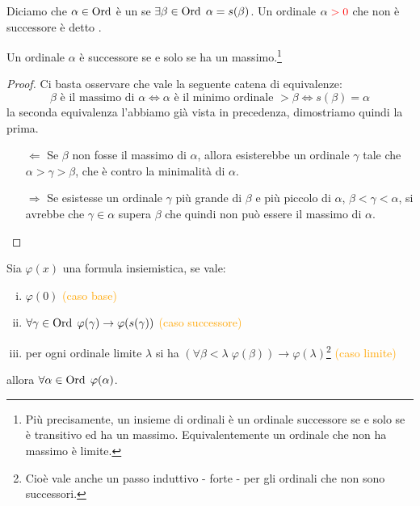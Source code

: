 \begin{definition}
	Diciamo che $\alpha \in \operatorname{Ord}$ è un  se $\exists \beta \in \operatorname{Ord} \; \alpha = s(\beta)$. Un ordinale $\alpha\;\textcolor{red}{> 0}$ che non è successore è detto .
\end{definition}

\begin{remark}
	Un ordinale $\alpha$ è successore se e solo se ha un massimo.\footnote{Più precisamente, un insieme di ordinali è un ordinale successore se e solo se è transitivo ed ha un massimo. Equivalentemente un ordinale che non ha massimo è limite.}
\end{remark}

\begin{proof}
	Ci basta osservare che vale la seguente catena di equivalenze:
	\[ \text{$\beta$ è il massimo di $\alpha$} \iff \text{$\alpha$ è il minimo ordinale $> \beta$} \iff s(\beta) = \alpha
		\]
	la seconda equivalenza l'abbiamo già vista in precedenza, dimostriamo quindi la prima.
	\begin{itemize}
		\item[$\boxed{\Longleftarrow}$] Se $\beta$ non fosse il massimo di $\alpha$, allora esisterebbe un ordinale $\gamma$ tale che $\alpha > \gamma > \beta$, che è contro la minimalità di $\alpha$.
		\item[$\boxed{\Longrightarrow}$] Se esistesse un ordinale $\gamma$ più grande di $\beta$ e più piccolo di $\alpha$, $\beta < \gamma < \alpha$, si avrebbe che $\gamma \in \alpha$ supera $\beta$ che quindi non può essere il massimo di $\alpha$.
	\end{itemize}
\end{proof}

\begin{proposition}
	\label{induz_transf2}
	Sia $\varphi(x)$ una formula insiemistica, se vale:
	\begin{enumerate}[(i)]
		\item $\varphi(0)$ \textcolor{orange}{(caso base)}
		\item $\forall \gamma \in \operatorname{Ord} \; \varphi(\gamma) \rightarrow \varphi(s(\gamma))$ \textcolor{orange}{(caso successore)}
		\item per ogni ordinale limite $\lambda$ si ha $(\forall \beta < \lambda \; \varphi(\beta)) \rightarrow \varphi(\lambda)$\footnote{Cioè vale anche un passo induttivo - forte - per gli ordinali che non sono successori.} \textcolor{orange}{(caso limite)}
	\end{enumerate}
	allora $\forall \alpha \in \operatorname{Ord} \; \varphi(\alpha)$.
\end{proposition}


